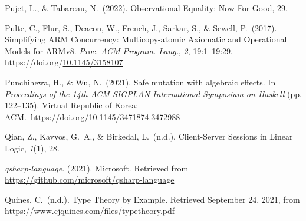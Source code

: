 \documentclass[12pt,twoside]{article}
\begin{document}
{\begin{thebibliography}{1079}
\mdbibitemlabel{}Pujet, L., \& Tabareau, N.~(2022). Observational Equality: Now For Good, 29.%

\mdbibitemlabel{}Pulte, C., Flur, S., Deacon, W., French, J., Sarkar, S., \& Sewell, P.~(2017). Simplifying ARM Concurrency: Multicopy-atomic Axiomatic and Operational Models for ARMv8. \emph{Proc. ACM Program. Lang.}, \emph{2}, 19:1–19:29. https://doi.org/\href{https://dx.doi.org/10.1145/3158107}{10.1145/3158107}%

\mdbibitemlabel{}Punchihewa, H., \& Wu, N.~(2021). Safe mutation with algebraic effects. In \emph{Proceedings of the 14th ACM SIGPLAN International Symposium on Haskell} (pp. 122–135). Virtual Republic of Korea: ACM.~https://doi.org/\href{https://dx.doi.org/10.1145/3471874.3472988}{10.1145/3471874.3472988}%

\mdbibitemlabel{}Qian, Z., Kavvos, G.~A., \& Birkedal, L.~(n.d.). Client-Server Sessions in Linear Logic, \emph{1}(1), 28.%

\mdbibitemlabel{}\emph{qsharp-language}. (2021). Microsoft. Retrieved from \href{https://github.com/microsoft/qsharp-language}{{\ttfamily https://\hspace{0pt}github.\hspace{0pt}com/\hspace{0pt}microsoft/\hspace{0pt}qsharp-\hspace{0pt}language}}%

\mdbibitemlabel{}Quines, C.~(n.d.). Type Theory by Example. Retrieved September 24, 2021, from \href{https://www.cjquines.com/files/typetheory.pdf}{{\ttfamily https://\hspace{0pt}www.\hspace{0pt}cjquines.\hspace{0pt}com/\hspace{0pt}files/\hspace{0pt}typetheory.\hspace{0pt}pdf}}%


\end{thebibliography}}
\end{document}
